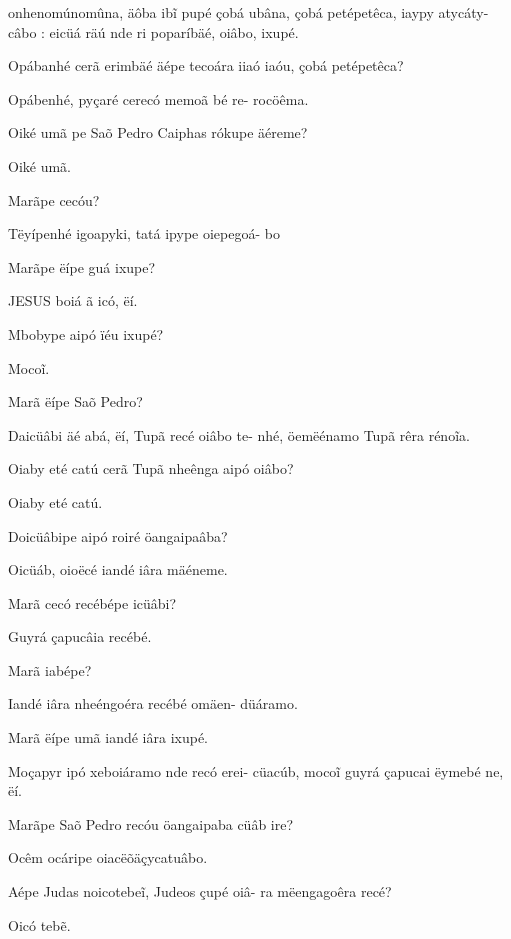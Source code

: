 \documentclass[openany,titlepage,12pt]{book}
\begin{document}
\begin{altereven}
        onhenomúnomûna, äôba ib\~i pupé çobá
        ubâna, çobá petépetêca, iaypy atycáty-\linebreak
        câbo : eicüá räú nde ri poparíbäé, oiâbo,
        ixupé.
    \item Opábanhé cerã erimbäé äépe
        tecoára iiaó iaóu, çobá petépetêca?
    \item Opábenhé, pyçaré cerecó memoã bé re-
        rocöêma.
    \item Oiké umã pe Saõ Pedro Caiphas rókupe
        äéreme?
    \item Oiké umã.
    \item Marãpe cecóu?
    \item Tëyípenhé igoapyki, tatá ipype oiepegoá-
        bo
    \item Marãpe ëípe guá ixupe?
    \item JESUS boiá ã icó, ëí.
    \item Mbobype aipó ïéu ixupé?
    \item Moco\~i.
    \item Marã ëípe Saõ Pedro?
    \item Daicüâbi äé abá, ëí, Tupã recé oiâbo te-
        nhé, öemëénamo Tupã rêra réno\~ia.
    \item Oiaby eté catú cerã Tupã nheênga aipó oiâbo?
    \item Oiaby eté catú.
    \item Doicüâbipe aipó roiré öangaipaâba?
    \item Oicüáb, oioëcé iandé iâra mäéneme.
    \item Marã cecó recébépe icüâbi?
    \item Guyrá çapucâia recébé.
    \item Marã iabépe?
    \item Iandé iâra nheéngoéra recébé omäen-\linebreak
        düáramo.
    \item Marã ëípe umã iandé iâra ixupé.
    \item Moçapyr ipó xeboiáramo nde recó erei-
        cüacúb, moco\~i guyrá çapucai ëymebé\linebreak 
        ne, ëí.
    \item Marãpe Saõ Pedro recóu öangaipaba\linebreak
        cüâb ire?
    \item Ocêm ocáripe oiacëõäçycatuâbo.
    \item Aépe Judas noicotebe\~i, Judeos çupé oiâ-
        ra mëengagoêra recé?
    \item Oicó teb\~e.

\end{altereven}
\end{document}
